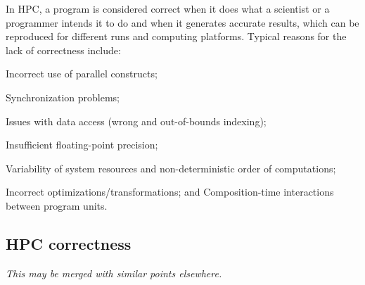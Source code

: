 

In HPC, a program is considered correct when it does what
a scientist or a programmer intends it to do and when it
generates accurate results, which can be reproduced for
different runs and computing platforms. 
%
Typical reasons
for the lack of correctness include: 

\begin{compactitem}
\item Incorrect use of
parallel constructs; 

\item Synchronization problems; 

\item Issues with
data access (wrong and out-of-bounds indexing);

\item Insufficient floating-point precision;

\item Variability of system resources and non-deterministic
order of computations; 

\item Incorrect optimizations/transformations;
and Composition-time interactions between program units.


\end{compactitem}

\subsection{HPC correctness}

{\small\em This may be merged with similar points elsewhere.}

